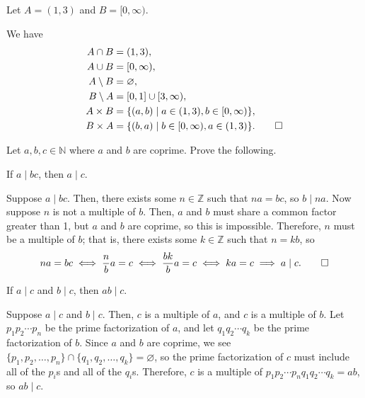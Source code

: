 \begin{exer}
Let $ A=(1,3) $ and $ B=[0,\infty ) $.
\end{exer}
\begin{sltn}
We have
\begin{align*}
    A\cap B &= (1,3), \\
    A\cup B &= [0,\infty ), \\
    A\setminus B &= \varnothing, \\
    B\setminus A &= [0,1]\cup [3,\infty ), \\
    A\times B &= \{(a,b)\mid a\in(1,3),b\in [0,\infty )\}, \\
    B\times A &= \{(b,a)\mid b\in [0,\infty ),a\in (1,3)\}.\qedhere
\end{align*}
\end{sltn}

Let $ a,b,c\in\mathbb{N} $ where $ a $ and $ b $ are coprime. Prove the following.

\begin{exer}
If $ a\mid bc $, then $ a\mid c $.
\end{exer}
\begin{sltn}
Suppose $ a\mid bc $. Then, there exists some $ n\in\mathbb{Z} $ such that $ na=bc $, so $ b\mid na $. Now suppose $ n $ is not a multiple of $ b $. Then, $ a $ and $ b $ must share a common factor greater than 1, but $ a $ and $ b $ are coprime, so this is impossible. Therefore, $ n $ must be a multiple of $ b $; that is, there exists some $ k\in\mathbb{Z} $ such that $ n=kb $, so
\begin{equation*}
    na=bc \iff \frac{n}{b}a=c \iff \frac{bk}{b}a=c \iff ka=c \implies a\mid c.\qedhere
\end{equation*}
\end{sltn}

\begin{exer}
If $ a\mid c $ and $ b\mid c $, then $ ab\mid c $.
\end{exer}
\begin{sltn}
Suppose $ a\mid c $ and $ b\mid c $. Then, $ c $ is a multiple of $ a $, and $ c $ is a multiple of $ b $. Let $ p_1p_2\cdots p_n $ be the prime factorization of $ a $, and let $ q_1q_2\cdots q_k $ be the prime factorization of $ b $. Since $ a $ and $ b $ are coprime, we see $ \{p_1,p_2,\ldots,p_n\}\cap\{q_1,q_2,\ldots,q_k\}=\varnothing $, so the prime factorization of $ c $ must include all of the $ p_i $s and all of the $ q_i $s. Therefore, $ c $ is a multiple of $ p_1p_2\cdots p_nq_1q_2\cdots q_k=ab $, so $ ab\mid c $.
\end{sltn}